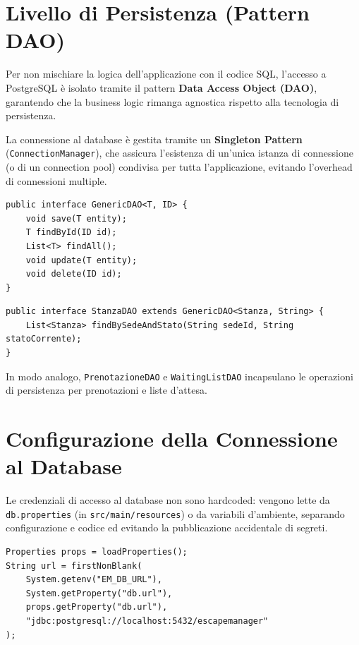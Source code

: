 \section{Livello di Persistenza (Pattern DAO)}

Per non mischiare la logica dell'applicazione con il codice SQL, l'accesso a PostgreSQL è isolato tramite il pattern \textbf{Data Access Object (DAO)}, garantendo che la business logic rimanga agnostica rispetto alla tecnologia di persistenza.

La connessione al database è gestita tramite un \textbf{Singleton Pattern} (\texttt{ConnectionManager}), che assicura l'esistenza di un'unica istanza di connessione (o di un connection pool) condivisa per tutta l'applicazione, evitando l'overhead di connessioni multiple.

\begin{lstlisting}[caption={Interfaccia generica DAO (\texttt{GenericDAO.java})}, label={lst:dao_interface}]
public interface GenericDAO<T, ID> {
    void save(T entity);
    T findById(ID id);
    List<T> findAll();
    void update(T entity);
    void delete(ID id);
}
\end{lstlisting}

\begin{lstlisting}[caption={Specializzazione per il dominio (\texttt{StanzaDAO.java})}, label={lst:stanza_dao}]
public interface StanzaDAO extends GenericDAO<Stanza, String> {
    List<Stanza> findBySedeAndStato(String sedeId, String statoCorrente);
}
\end{lstlisting}

In modo analogo, \texttt{PrenotazioneDAO} e \texttt{WaitingListDAO} incapsulano le operazioni di persistenza per prenotazioni e liste d'attesa.

\section{Configurazione della Connessione al Database}
Le credenziali di accesso al database non sono hardcoded: vengono lette da \texttt{db.properties} (in \texttt{src/main/resources}) o da variabili d'ambiente, separando configurazione e codice ed evitando la pubblicazione accidentale di segreti.

\begin{lstlisting}[caption={Caricamento della configurazione DB dal classpath}]
Properties props = loadProperties();
String url = firstNonBlank(
    System.getenv("EM_DB_URL"),
    System.getProperty("db.url"),
    props.getProperty("db.url"),
    "jdbc:postgresql://localhost:5432/escapemanager"
);
\end{lstlisting}

